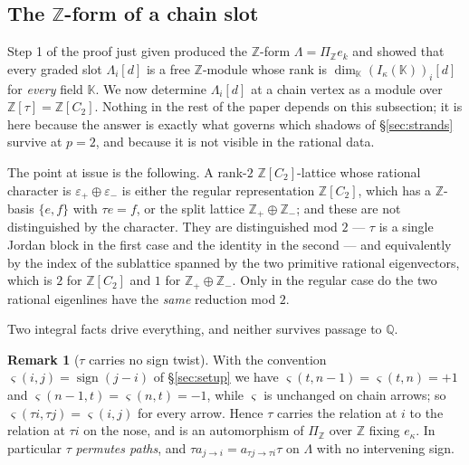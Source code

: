 \documentclass[reqno]{amsart}
\theoremstyle{plain}
\theoremstyle{definition}
\newtheorem{remark}[theorem]{Remark}
\newcommand{\ka}{\kappa}
\newcommand{\Pia}{\Pi}
\newcommand{\eps}{\varepsilon}
\begin{document}
\subsection{The \texorpdfstring{$\mathbb{Z}$}{Z}-form of a chain slot}
\label{ss:zslot}

Step 1 of the proof just given produced the $\mathbb{Z}$-form
$\Lambda=\Pia_{\mathbb{Z}}e_k$ and showed that every graded slot
$\Lambda_i[d]$ is a free $\mathbb{Z}$-module whose rank is
$\dim_{\mathbb{K}}(I_\ka(\mathbb{K}))_i[d]$ for \emph{every} field
$\mathbb{K}$.  We now determine $\Lambda_i[d]$ at a chain vertex as a module
over $\mathbb{Z}[\tau]=\mathbb{Z}[C_2]$.  Nothing in the rest of the paper
depends on this subsection; it is here because the answer is exactly what
governs which shadows of \S\ref{sec:strands} survive at $p=2$, and because it
is not visible in the rational data.

The point at issue is the following.  A rank-$2$ $\mathbb{Z}[C_2]$-lattice
whose rational character is $\eps_+\oplus\eps_-$ is either the regular
representation $\mathbb{Z}[C_2]$, which has a $\mathbb{Z}$-basis $\{e,f\}$
with $\tau e=f$, or the split lattice
$\mathbb{Z}_+\oplus\mathbb{Z}_-$; and these are not distinguished by the
character.  They are distinguished mod $2$ --- $\tau$ is a single Jordan block
in the first case and the identity in the second --- and equivalently by the
index of the sublattice spanned by the two primitive rational eigenvectors,
which is $2$ for $\mathbb{Z}[C_2]$ and $1$ for
$\mathbb{Z}_+\oplus\mathbb{Z}_-$.  Only in the regular case do the two
rational eigenlines have the \emph{same} reduction mod $2$.

Two integral facts drive everything, and neither survives passage to
$\mathbb{Q}$.

\begin{remark}[$\tau$ carries no sign twist]\label{rem:tautwist}
With the convention $\varsigma(i,j)=\operatorname{sign}(j-i)$ of
\S\ref{sec:setup} we have
$\varsigma(t,n-1)=\varsigma(t,n)=+1$ and
$\varsigma(n-1,t)=\varsigma(n,t)=-1$, while $\varsigma$ is unchanged on chain
arrows; so $\varsigma(\tau i,\tau j)=\varsigma(i,j)$ for every arrow.  Hence
$\tau$ carries the relation at $i$ to the relation at $\tau i$ on the nose,
and is an automorphism of $\Pia_{\mathbb{Z}}$ over $\mathbb{Z}$ fixing $e_\ka$.
In particular $\tau$ \emph{permutes paths}, and $\tau a_{j\to i}=a_{\tau j\to
\tau i}\tau$ on $\Lambda$ with no intervening sign.
\end{remark}
\end{document}
